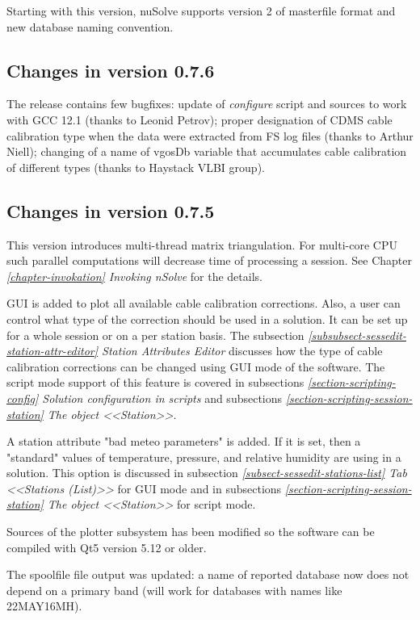 \documentclass [10pt,letterpaper]{report}
\newcommand{\nuSolve}{\greektext n\latintext Solve}
\begin{document}
{Starting with this version, nuSolve supports version 2 of masterfile format and
new database naming convention.


\subsection{Changes in version 0.7.6}
The release contains few bugfixes: update of {\it configure} script and sources
to work with GCC 12.1 (thanks to Leonid Petrov); proper designation of CDMS cable
calibration type when the data were extracted from FS log files (thanks to Arthur
Niell); changing of a name of vgosDb variable that accumulates cable calibration
of different types (thanks to Haystack VLBI group).

\subsection{Changes in version 0.7.5}
This version introduces multi-thread matrix triangulation. For multi-core CPU such
parallel computations will decrease time of processing a session. See Chapter
\emph{\ref{chapter-invokation} Invoking \nuSolve{}} for the details.

GUI is added to plot all available cable calibration corrections. Also, a user
can control what type of the correction should be used in a solution. It can be
set up for a whole session or on a per station basis. The subsection
\emph{\ref{subsubsect-sessedit-station-attr-editor} Station Attributes Editor}
discusses how the type of cable calibration corrections can be changed using GUI
mode of the software. The script mode support of this feature is covered in
subsections \emph{\ref{section-scripting-config} Solution configuration in scripts}
and
subsections \emph{\ref{section-scripting-session-station} The object <<Station>>}.

A station attribute "bad meteo parameters" is added. If it is set, then a "standard"
values of temperature, pressure, and relative humidity are using in a solution.
This option is discussed in subsection
\emph{\ref{subsect-sessedit-stations-list} Tab <<Stations (List)>>} for GUI mode
and in subsections
\emph{\ref{section-scripting-session-station} The object <<Station>>} for script mode.


Sources of the plotter subsystem has been modified so the software can be
compiled with Qt5 version 5.12 or older.

The spoolfile file output was updated: a name of reported database now does
not depend on a primary band (will work for databases with names like 22MAY16MH).



}
\end{document}

